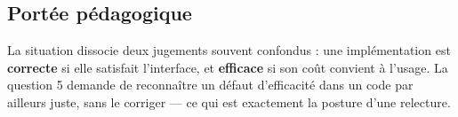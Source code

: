\subsection*{Portée pédagogique}

La situation dissocie deux jugements souvent confondus : une implémentation est
\textbf{correcte} si elle satisfait l'interface, et \textbf{efficace} si son
coût convient à l'usage. La question 5 demande de reconnaître un défaut
d'efficacité dans un code par ailleurs juste, sans le corriger — ce qui est
exactement la posture d'une relecture.
